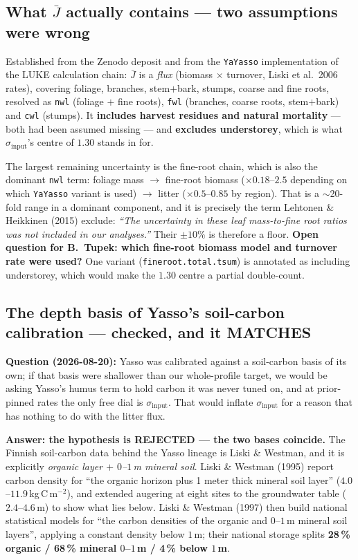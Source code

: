 \documentclass[11pt]{article}
\newcommand{\sinput}{\sigma_{\mathrm{input}}}
\begin{document}
\subsection{What $\bar{J}$ actually contains --- two assumptions were wrong}\label{sec:jbar}

Established from the Zenodo deposit and from the \texttt{YaYasso} implementation of the LUKE
calculation chain: $\bar{J}$ is a \emph{flux} (biomass $\times$ turnover, Liski et al.\ 2006
rates), covering foliage, branches, stem$+$bark, stumps, coarse and fine roots, resolved as
\texttt{nwl} (foliage $+$ fine roots), \texttt{fwl} (branches, coarse roots, stem$+$bark) and
\texttt{cwl} (stumps). It \textbf{includes harvest residues and natural mortality} --- both had
been assumed missing --- and \textbf{excludes understorey}, which is what $\sinput$'s centre of
$1.30$ stands in for.

The largest remaining uncertainty is the fine-root chain, which is also the dominant
\texttt{nwl} term: foliage mass $\to$ fine-root biomass ($\times 0.18$--$2.5$ depending on which
\texttt{YaYasso} variant is used) $\to$ litter ($\times 0.5$--$0.85$ by region). That is a
$\sim$20-fold range in a dominant component, and it is precisely the term Lehtonen \& Heikkinen (2015)
exclude: \emph{``The uncertainty in these leaf mass-to-fine root ratios was not included in our
analyses.''} Their $\pm10\%$ is therefore a floor. \textbf{Open question for B.\ Tupek: which
fine-root biomass model and turnover rate were used?} One variant
(\texttt{fineroot.total.tsum}) is annotated as including understorey, which would make the
$1.30$ centre a partial double-count.

\subsection{The depth basis of Yasso's soil-carbon calibration --- checked, and it MATCHES}
\label{sec:yassodepth}

\textbf{Question (2026-08-20):} Yasso was calibrated against a soil-carbon basis of its own; if that
basis were shallower than our whole-profile target, we would be asking Yasso's humus term to hold
carbon it was never tuned on, and at prior-pinned rates the only free dial is $\sinput$. That would
inflate $\sinput$ for a reason that has nothing to do with the litter flux.

\textbf{Answer: the hypothesis is REJECTED --- the two bases coincide.} The Finnish soil-carbon data
behind the Yasso lineage is Liski \& Westman, and it is explicitly \emph{organic layer $+$ $0$--$1$\,m
mineral soil}. Liski \& Westman (1995) report carbon density for ``the organic horizon plus 1 meter
thick mineral soil layer'' ($4.0$--$11.9$\,kg\,C\,m$^{-2}$), and extended augering at eight sites to
the groundwater table ($2.4$--$4.6$\,m) to show what lies below. Liski \& Westman (1997) then build
national statistical models for ``the carbon densities of the organic and $0$--$1$\,m mineral soil
layers'', applying a constant density below $1$\,m; their national storage splits
\textbf{28\,\% organic / 68\,\% mineral $0$--$1$\,m / 4\,\% below $1$\,m}.
\end{document}
